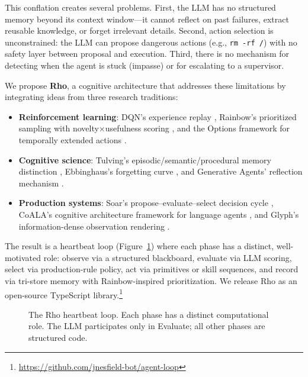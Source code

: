 \documentclass[letterpaper]{article}
\begin{document}
This conflation creates several problems. First, the LLM has no structured memory beyond its context window---it cannot reflect on past failures, extract reusable knowledge, or forget irrelevant details. Second, action selection is unconstrained: the LLM can propose dangerous actions (e.g., \texttt{rm~-rf~/}) with no safety layer between proposal and execution. Third, there is no mechanism for detecting when the agent is stuck (impasse) or for escalating to a supervisor.

We propose \textbf{Rho}, a cognitive architecture that addresses these limitations by integrating ideas from three research traditions:

\begin{itemize}[leftmargin=1.5em,itemsep=2pt]
  \item \textbf{Reinforcement learning}: DQN's experience replay \citep{mnih2015human}, Rainbow's prioritized sampling with novelty$\times$usefulness scoring \citep{hessel2018rainbow}, and the Options framework for temporally extended actions \citep{sutton1999between}.
  \item \textbf{Cognitive science}: Tulving's episodic/semantic/procedural memory distinction \citep{tulving1972episodic}, Ebbinghaus's forgetting curve \citep{ebbinghaus1885memory}, and Generative Agents' reflection mechanism \citep{park2023generative}.
  \item \textbf{Production systems}: Soar's propose--evaluate--select decision cycle \citep{laird2012soar}, CoALA's cognitive architecture framework for language agents \citep{sumers2024cognitive}, and Glyph's information-dense observation rendering \citep{cheng2025glyph}.
\end{itemize}

The result is a heartbeat loop (Figure~\ref{fig:heartbeat}) where each phase has a distinct, well-motivated role: observe via a structured blackboard, evaluate via LLM scoring, select via production-rule policy, act via primitives or skill sequences, and record via tri-store memory with Rainbow-inspired prioritization. We release Rho as an open-source TypeScript library.\footnote{\url{https://github.com/jnesfield-bot/agent-loop}}

\begin{figure}[t]
\centering
{}
\caption{The Rho heartbeat loop. Each phase has a distinct computational role. The LLM participates only in Evaluate; all other phases are structured code.}
\label{fig:heartbeat}
\end{figure}
\end{document}
